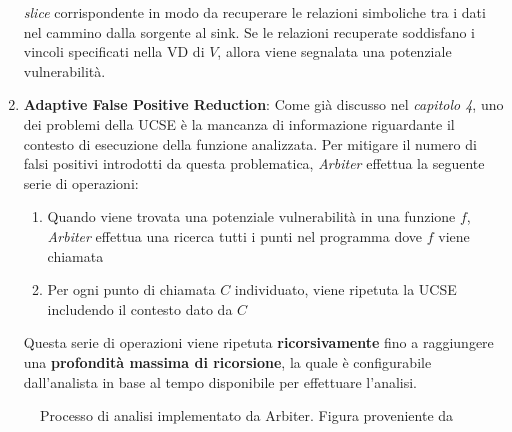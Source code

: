 \documentclass[../main.tex]{subfiles}
\begin{document}
\begin{enumerate}
    \textit{slice} corrispondente in modo da recuperare le relazioni simboliche tra i dati nel cammino dalla sorgente al sink. Se le relazioni recuperate soddisfano i vincoli specificati nella VD di $V$, allora viene
    segnalata una potenziale vulnerabilità.
    \item \textbf{Adaptive False Positive Reduction}: Come già discusso nel \textit{capitolo 4}, uno dei problemi della UCSE è la mancanza di informazione riguardante il contesto di esecuzione della funzione analizzata. Per mitigare
    il numero di falsi positivi introdotti da questa problematica, \textit{Arbiter} effettua la seguente serie di operazioni:
    \begin{enumerate}
        \item Quando viene trovata una potenziale vulnerabilità in una funzione $f$, \textit{Arbiter} effettua una ricerca tutti i punti nel programma dove $f$ viene chiamata
        \item Per ogni punto di chiamata $C$ individuato, viene ripetuta la UCSE includendo il contesto dato da $C$
    \end{enumerate}
    Questa serie di operazioni viene ripetuta \textbf{ricorsivamente} fino a raggiungere una \textbf{profondità massima di ricorsione}, la quale è configurabile dall'analista in base al tempo disponibile per effettuare l'analisi.
\end{enumerate}
\begin{figure}[H]
  \caption{Processo di analisi implementato da Arbiter. Figura proveniente da \cite{Arbier}}
  \label{fig:key}
\end{figure}
\end{document}
